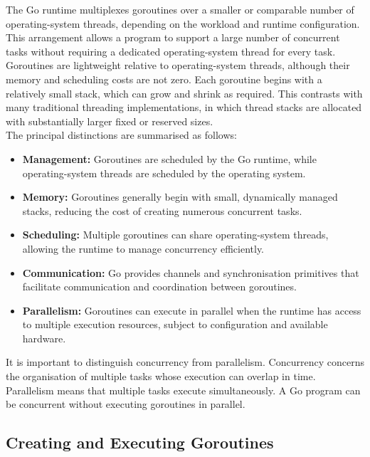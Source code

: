 The Go runtime multiplexes goroutines over a smaller or comparable number of operating-system threads, depending on the workload and runtime configuration. This arrangement allows a program to support a large number of concurrent tasks without requiring a dedicated operating-system thread for every task.\\

Goroutines are lightweight relative to operating-system threads, although their memory and scheduling costs are not zero. Each goroutine begins with a relatively small stack, which can grow and shrink as required. This contrasts with many traditional threading implementations, in which thread stacks are allocated with substantially larger fixed or reserved sizes.\\

The principal distinctions are summarised as follows:

\begin{itemize}
    \item \textbf{Management:} Goroutines are scheduled by the Go runtime, while operating-system threads are scheduled by the operating system.
    \item \textbf{Memory:} Goroutines generally begin with small, dynamically managed stacks, reducing the cost of creating numerous concurrent tasks.
    \item \textbf{Scheduling:} Multiple goroutines can share operating-system threads, allowing the runtime to manage concurrency efficiently.
    \item \textbf{Communication:} Go provides channels and synchronisation primitives that facilitate communication and coordination between goroutines.
    \item \textbf{Parallelism:} Goroutines can execute in parallel when the runtime has access to multiple execution resources, subject to configuration and available hardware.
\end{itemize}

It is important to distinguish concurrency from parallelism. Concurrency concerns the organisation of multiple tasks whose execution can overlap in time. Parallelism means that multiple tasks execute simultaneously. A Go program can be concurrent without executing goroutines in parallel.

\subsection{Creating and Executing Goroutines}

